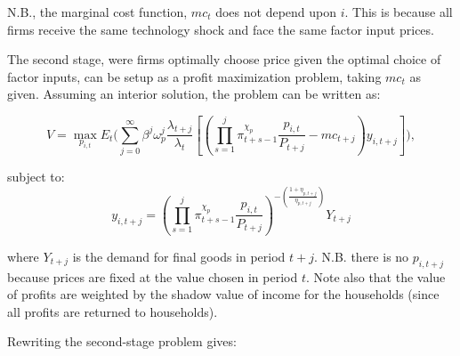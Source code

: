 \documentclass[article,11pt,letterpaper,fleqn]{article}
\theoremstyle{definition}
\numberwithin{equation}{section}
\begin{document}
\noindent\noindent N.B., the marginal cost function, $mc_{t}$ does not depend upon $i$.  This is because all firms receive the same technology shock and face the same factor input prices.


The second stage, were firms optimally choose price given the optimal choice of factor inputs, can be setup as a profit maximization problem, taking $mc_{t}$ as given.  Assuming an interior solution, the problem can be written as:

\begin{equation}
V=\max_{p_{i,t}}E_{t}\Biggl(\sum_{j=0}^{\infty}\beta^{j}\omega^{j}_{p}\frac{\lambda_{t+j}}{\lambda_{t}}\left[\left(\prod_{s=1}^{j}\pi^{\chi_{p}}_{t+s-1}\frac{p_{i,t}}{P_{t+j}}-mc_{t+j}\right)y_{i,t+j}\right]\Biggr),
\end{equation}


\noindent\noindent subject to: 
\begin{equation}
y_{i,t+j}=\left(\prod_{s=1}^{j}\pi^{\chi_{p}}_{t+s-1}\frac{p_{i,t}}{P_{t+j}}\right)^{-\left(\frac{1+\eta_{p,t+j}}{\eta_{p,t+j}}\right)}Y_{t+j}
\end{equation}

\noindent\noindent where $Y_{t+j}$ is the demand for final goods in period $t+j$.  N.B. there is no $p_{i,t+j}$ because prices are fixed at the value chosen in period $t$.  Note also that the value of profits are weighted by the shadow value of income for the households (since all profits are returned to households).


Rewriting the second-stage problem gives:
\end{document}
